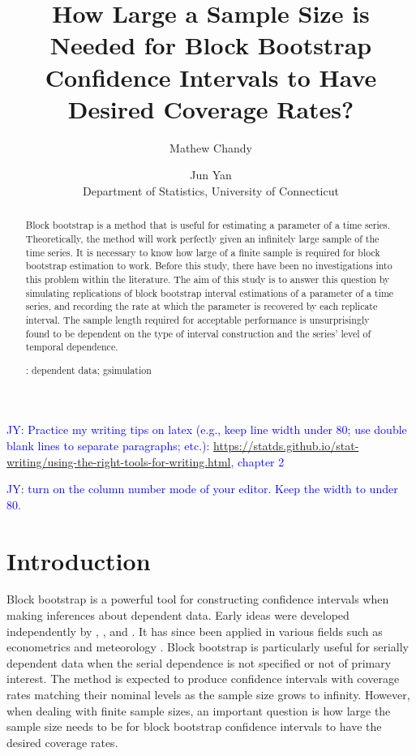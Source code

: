 \documentclass[12pt, letterpaper, titlepage]{article}
\title{How Large a Sample Size is Needed for Block Bootstrap Confidence
  Intervals
  to Have Desired Coverage Rates?}
\author{Mathew Chandy
  \and Jun Yan\\[1ex]
  Department of Statistics, University of Connecticut\\
}
\date{}
\newcommand{\jy}[1]{\textcolor{blue}{JY: #1}}
\begin{document}
 
\maketitle

\begin{abstract}
Block bootstrap is a method that is useful for estimating a parameter of a time
series. Theoretically, the method will work perfectly given an infinitely
large sample of the time series. It is necessary to know how large of a finite
sample is required for block bootstrap estimation to work. Before this study,
there have been no investigations into this problem within the literature. The
aim of this study is to answer this question by simulating replications of
block bootstrap interval estimations of a parameter of a time series, and
recording the rate at which the parameter is recovered by each replicate
interval. The sample length required for acceptable performance is
unsurprisingly found to be dependent on the type of interval construction and
the series' level of temporal dependence.


\bigskip
{}:
dependent data; gsimulation
\end{abstract}

\doublespace

\jy{Practice my writing tips on latex (e.g., keep line width under 80; use
  double blank lines to separate paragraphs; etc.):
  \url{
https://statds.github.io/stat-writing/using-the-right-tools-for-writing.html},
  chapter 2}

\jy{turn on the column number mode of your editor. Keep the width to under 80.}


\section{Introduction}
\label{sec:intro}

Block bootstrap is a powerful tool for constructing confidence intervals when
making inferences about dependent data. Early ideas were developed
independently by \citet{hall1985resampling}, \citet{carlstein1986use}, and 
\citet{kunsch1989jackknife}.
It has since been applied in various fields such as econometrics
\citep{mackinnon2006bootstrap} and meteorology \citep{varga2017generalised}.
Block bootstrap is particularly useful for serially dependent
data when the serial dependence is not specified or not of primary interest.
The method is expected to produce confidence intervals with coverage rates
matching their nominal levels as the sample size grows to infinity. However,
when dealing with finite sample sizes, an important question is how large the
sample size needs to be for block bootstrap confidence intervals to have the
desired coverage rates.
\end{document}
